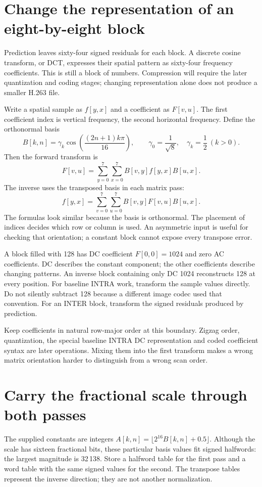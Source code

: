 \section{Change the representation of an eight-by-eight block}
Prediction leaves sixty-four signed residuals for each block. A discrete cosine
transform, or DCT, expresses their spatial pattern as sixty-four frequency
coefficients. This is still a block of numbers. Compression will require the
later quantization and coding stages; changing representation alone does not
produce a smaller H.263 file.

Write a spatial sample as $f[y,x]$ and a coefficient as $F[v,u]$. The first
coefficient index is vertical frequency, the second horizontal frequency.
Define the orthonormal basis
\[
  B[k,n]=\gamma_k\cos\!\left(\frac{(2n+1)k\pi}{16}\right),\qquad
  \gamma_0=\frac{1}{\sqrt8},\quad \gamma_k=\frac12\ (k>0).
\]
Then the forward transform is
\[
  F[v,u]=\sum_{y=0}^{7}\sum_{x=0}^{7}B[v,y]f[y,x]B[u,x].
\]
The inverse uses the transposed basis in each matrix pass:
\[
  f[y,x]=\sum_{v=0}^{7}\sum_{u=0}^{7}B[v,y]F[v,u]B[u,x].
\]
The formulas look similar because the basis is orthonormal. The placement of
indices decides which row or column is used. An asymmetric input is useful for
checking that orientation; a constant block cannot expose every transpose error.

A block filled with 128 has DC coefficient $F[0,0]=1024$ and zero AC coefficients.
DC describes the constant component; the other coefficients describe changing
patterns. An inverse block containing only DC 1024 reconstructs 128 at every
position. For baseline INTRA work, transform the sample values directly. Do not
silently subtract 128 because a different image codec used that convention.
For an INTER block, transform the signed residuals produced by prediction.

Keep coefficients in natural row-major order at this boundary. Zigzag order,
quantization, the special baseline INTRA DC representation and coded coefficient
syntax are later operations. Mixing them into the first transform makes a wrong
matrix orientation harder to distinguish from a wrong scan order.

\section{Carry the fractional scale through both passes}
The supplied constants are integers
$A[k,n]=\lfloor 2^{16}B[k,n]+0.5\rfloor$. Although the scale has sixteen
fractional bits, these particular basis values fit signed halfwords: the largest
magnitude is 32\,138. Store a halfword table for the first pass and a word table
with the same signed values for the second. The transpose tables represent the
inverse direction; they are not another normalization.

